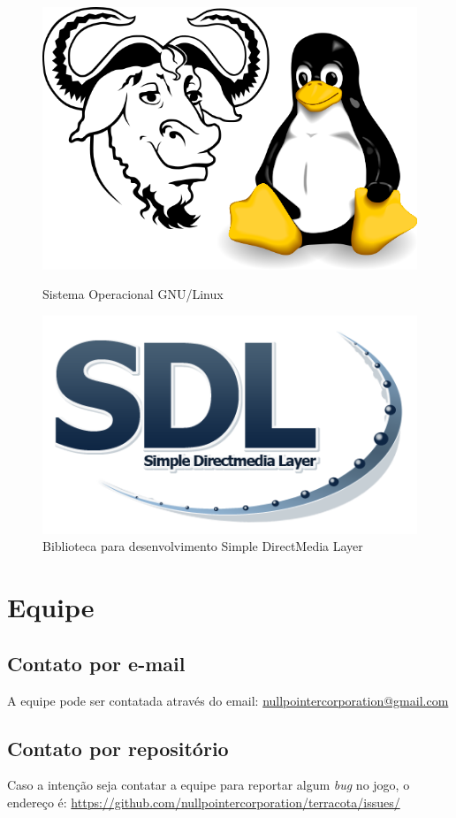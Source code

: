 \documentclass[11pt]{article}
\begin{document}
\begin{figure}[!htb]
	\centering
		\begin{minipage}{0.5\textwidth}
		\includegraphics[scale=0.2]{logo-gnu-linux.png}
		\caption{Sistema Operacional GNU/Linux}
		\label{GNU/Linux logo}
	\end{minipage}%
	\begin{minipage}{0.5\textwidth}
		\centering
		\includegraphics[scale=0.2]{logo-sdl.png}
		\caption{Biblioteca para desenvolvimento Simple DirectMedia Layer}
		\label{SDL logo}
	\end{minipage}
\end{figure}

\section{Equipe}
\subsection{Contato por e-mail}
A equipe pode ser contatada através do email: \href{mailto:nullpointercorporation@gmail.com}{nullpointercorporation@gmail.com}

\subsection{Contato por repositório}
Caso a intenção seja contatar a equipe para reportar algum \textit{bug} no jogo, o endereço é: \href{https://github.com/nullpointercorporation/terracota/issues/}{https://github.com/nullpointercorporation/terracota/issues/}
\newpage
\end{document}
